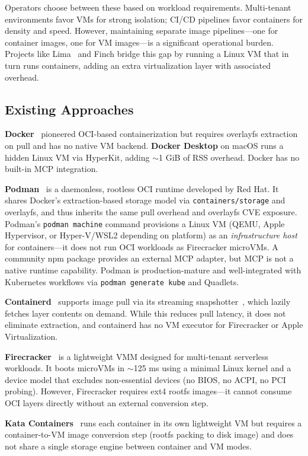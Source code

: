 \documentclass[11pt,a4paper]{article}
\begin{document}
Operators choose between these based on workload requirements. Multi-tenant environments favor VMs for strong isolation; CI/CD pipelines favor containers for density and speed. However, maintaining separate image pipelines---one for container images, one for VM images---is a significant operational burden. Projects like Lima~\cite{lima} and Finch bridge this gap by running a Linux VM that in turn runs containers, adding an extra virtualization layer with associated overhead.

\subsection{Existing Approaches}

\textbf{Docker}~\cite{docker} pioneered OCI-based containerization but requires overlayfs extraction on pull and has no native VM backend. \textbf{Docker Desktop} on macOS runs a hidden Linux VM via HyperKit, adding $\sim$1 GiB of RSS overhead. Docker has no built-in MCP integration.

\textbf{Podman}~\cite{podman} is a daemonless, rootless OCI runtime developed by Red Hat. It shares Docker's extraction-based storage model via \texttt{containers/storage} and overlayfs, and thus inherits the same pull overhead and overlayfs CVE exposure. Podman's \texttt{podman machine} command provisions a Linux VM (QEMU, Apple Hypervisor, or Hyper-V/WSL2 depending on platform) as an \emph{infrastructure host} for containers---it does not run OCI workloads as Firecracker microVMs. A community npm package provides an external MCP adapter, but MCP is not a native runtime capability. Podman is production-mature and well-integrated with Kubernetes workflows via \texttt{podman generate kube} and Quadlets.

\textbf{Containerd}~\cite{containerd} supports image pull via its streaming snapshotter~\cite{stargz}, which lazily fetches layer contents on demand. While this reduces pull latency, it does not eliminate extraction, and containerd has no VM executor for Firecracker or Apple Virtualization.

\textbf{Firecracker}~\cite{firecracker} is a lightweight VMM designed for multi-tenant serverless workloads. It boots microVMs in $\sim$125 ms using a minimal Linux kernel and a device model that excludes non-essential devices (no BIOS, no ACPI, no PCI probing). However, Firecracker requires ext4 rootfs images---it cannot consume OCI layers directly without an external conversion step.

\textbf{Kata Containers}~\cite{kata} runs each container in its own lightweight VM but requires a container-to-VM image conversion step (rootfs packing to disk image) and does not share a single storage engine between container and VM modes.
\end{document}
